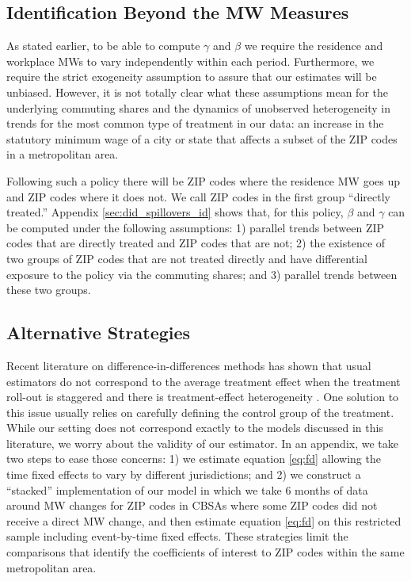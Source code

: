 \subsection{Identification Beyond the MW Measures}

As stated earlier, to be able to compute $\gamma$ and $\beta$ we require the 
residence and workplace MWs to vary independently within each period.
Furthermore, we require the strict exogeneity assumption to assure that our
estimates will be unbiased.
However, it is not totally clear what these assumptions mean for the underlying 
commuting shares and the dynamics of unobserved heterogeneity in trends for the 
most common type of treatment in our data: 
an increase in the statutory minimum wage of a city or state that affects 
a subset of the ZIP codes in a metropolitan area.

Following such a policy there will be ZIP codes where the residence MW goes up
and ZIP codes where it does not.
We call ZIP codes in the first group ``directly treated.''
Appendix \ref{sec:did_spillovers_id} shows that, for this policy, 
$\beta$ and $\gamma$ can be computed under the following assumptions: 
1) parallel trends between ZIP codes that are directly treated and ZIP codes 
that are not;
2) the existence of two groups of ZIP codes that are not treated directly and
have differential exposure to the policy via the commuting shares; and 
3) parallel trends between these two groups.

\subsection{Alternative Strategies}\label{sec:alt_emp_strategies}

Recent literature on difference-in-differences methods has shown that usual
estimators do not correspond to the average treatment effect when the treatment 
roll-out is staggered and there is treatment-effect heterogeneity 
\parencite{deChaisemartinEtAl2022,RothEtAl2022}.
One solution to this issue usually relies on carefully defining the control
group of the treatment.
While our setting does not correspond exactly to the models discussed in this
literature, we worry about the validity of our estimator.
In an appendix, we take two steps to ease those concerns:
1) we estimate equation \eqref{eq:fd} allowing the time fixed effects to vary
by different jurisdictions; and
2) we construct a ``stacked'' implementation of our model in which we take
6 months of data around MW changes for ZIP codes in CBSAs where some ZIP codes 
did not receive a direct MW change, and then estimate equation \eqref{eq:fd} on
this restricted sample including event-by-time fixed effects.
These strategies limit the comparisons that identify the coefficients of 
interest to ZIP codes within the same metropolitan area.

